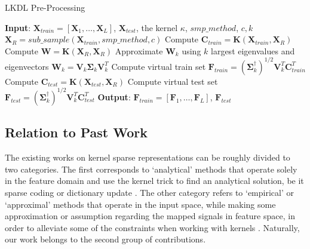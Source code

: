 \documentclass[journal]{IEEEtran}
\newcommand{\bX}{\mathbf{X}}
\newcommand{\bK}{\mathbf{K}}
\newcommand{\bF}{\mathbf{F}}
\newcommand{\bC}{\mathbf{C}}
\newcommand{\bW}{\mathbf{W}}
\newcommand{\bV}{\mathbf{V}}
\begin{document}
\begin{algorithm}
\caption{LKDL Pre-Processing}\label{LKDL-Preprocessing}
\begin{algorithmic}[1]
\State \textbf{Input}: $\bX_{train}=\left[\bX_1,\ldots,\bX_L\right]$, $\bX_{test}$, the kernel $\kappa$, $smp\_method$, $c, k$
\State $\bX_R=sub\_sample(\bX_{train},smp\_method,c)$
\State Compute $\bC_{train}=\bK(\bX_{train},\bX_R)$
\State Compute $\bW=\bK(\bX_R,\bX_R)$
\State Approximate $\bW_k$ using $k$ largest eigenvalues and eigenvectors $\bW_k=\bV_k\boldsymbol{\Sigma}_k\bV_k^T$
\State Compute virtual train set $\bF_{train} = \left(\boldsymbol{\Sigma}_k^{\dagger} \right)^{1/2} \mathbf{V}_k^T \bC_{train}^T$
\State Compute $\bC_{test}=\bK(\bX_{test},\bX_R)$
\State Compute virtual test set $\bF_{test} = \left(\boldsymbol{\Sigma}_k^{\dagger} \right)^{1/2} \mathbf{V}_k^T \bC_{test}^T$
\State \textbf{Output}: $\bF_{train}=\left[\bF_1,\ldots,\bF_L\right]$, $\bF_{test}$
\end{algorithmic}
\end{algorithm}

\subsection{Relation to Past Work}\label{SS:literature}

The existing works on kernel sparse representations can be roughly divided to two categories.
The first corresponds to `analytical' methods that operate solely in the feature domain and use the kernel trick to find an analytical solution, be it sparse coding or dictionary update \cite{KernelOMP,KSR,KDL,KernelizedDL}. The other category refers to `empirical' or `approximal' methods that operate in the input space, while making some approximation or assumption regarding the mapped signals in feature space, in order to alleviate some of the constraints when working with kernels \cite{KMP,KBP,KernelSRC1}. Naturally, our work belongs to the second group of contributions.
\end{document}
